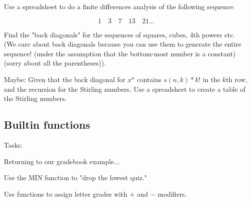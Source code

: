 Use a spreadsheet to do a finite differences analysis of the following sequence:

	  \[ 1 \quad 3 \quad 7 \quad 13 \quad 21 \ldots \]

Find the "back diagonals" for the sequences of squares, cubes, 4th powers etc.
(We care about back diagonals because you can use them to generate the entire sequence! (under the assumption that the bottom-most number is a constant) (sorry about all the parentheses)).

Maybe:
Given that the back diagonal for $x^n$ contains $s(n,k)*k!$ in the $k$th row, and the recursion for
the Stirling numbers.  Use a spreadsheet to create a table of the Stirling numbers.

\subsection{Builtin functions}

Tasks:

Returning to our gradebook example$\ldots$

Use the MIN function to "drop the lowest quiz."

Use functions to assign letter grades with $+$ and $-$ modifiers.
